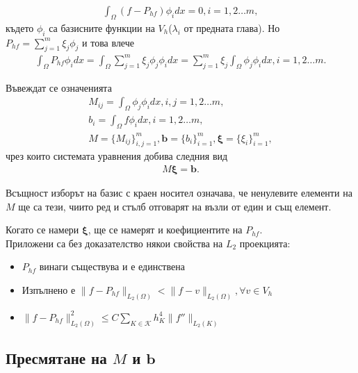 \documentclass{report}
\begin{document}
	\begin{align*}
		\int_\Omega (f-P_{hf})\phi_idx=0, i=1,2\dots m,
	\end{align*}
	където $\phi_i$ са базисните функции на $V_h$($\lambda_i$ от предната глава). Но $P_{hf}=\sum_{j=1}^m\xi_j\phi_j$ и това влече
	\begin{align*}
		\int_\Omega P_{hf}\phi_idx=\int_\Omega\sum_{j=1}^m \xi_j\phi_j\phi_idx=\sum_{j=1}^m \xi_j\int_\Omega\phi_j\phi_idx, i=1,2\dots m.
	\end{align*}
	
	Въвеждат се означенията 
	\begin{align*}
		M_{ij}=\int_\Omega\phi_j\phi_idx, i,j=1,2\dots m,\\
		b_i=\int_\Omega f\phi_idx, i=1,2\dots m,\\
		M=\{M_{ij}\}_{i,j=1}^m, \mathbf{b}=\{b_i\}_{i=1}^m, \boldsymbol{\xi}=\{\xi_i\}_{i=1}^m,
	\end{align*}
	чрез които системата уравнения добива следния вид
	\begin{align*}
		M\boldsymbol{\xi}=\mathbf{b}.
	\end{align*}
	
	Всъщност изборът на базис с краен носител означава, че ненулевите елементи на $M$ ще са тези, чиито ред и стълб отговарят на възли от един и същ елемент.
	
	Когато се намери $\boldsymbol{\xi}$, ще се намерят и коефициентите на $P_{hf}$.\\
	Приложени са без доказателство някои свойства на $L_2$ проекцията:
	\begin{itemize}
		\item $P_{hf}$ винаги съществува и е единствена
		\item Изпълнено е $\lVert f-P_{hf} \rVert_{L_2(\Omega)} < \lVert f-v \rVert_{L_2(\Omega)}, \forall v \in V_h$
		\item $\lVert f-P_{hf} \rVert_{L_2(\Omega)}^2 \leq C\sum_{K \in \mathcal{K}}h_K^4 \lVert f'' \rVert_{L_2(K)}$
	\end{itemize}
	
	\subsection{Пресмятане на $M$ и $\mathbf{b}$}
	
\end{document}
